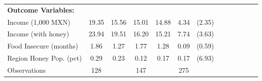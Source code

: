 \begin{table}[htbp]
\begin{tabular}{l*{3}{cccc}}
\addlinespace
\textbf{Outcome Variables:}&         &         &         &         &                  &         \\
\addlinespace
Income (1,000 MXN)&    19.35&    15.56&    15.01&    14.88&     4.34\sym{**} &   (2.35)\\
\addlinespace
Income (with honey)&    23.94&    19.51&    16.20&    15.21&     7.74\sym{***}&   (3.63)\\
\addlinespace
Food Insecure (months)&     1.86&     1.27&     1.77&     1.28&     0.09         &   (0.59)\\
\addlinespace
Region Honey Pop. (pct)&     0.29&     0.23&     0.12&     0.17&     0.17\sym{***}&   (6.93)\\
\midrule
Observations    &      128&         &      147&         &      275         &         \\
\bottomrule
\end{tabular}
\end{table}
